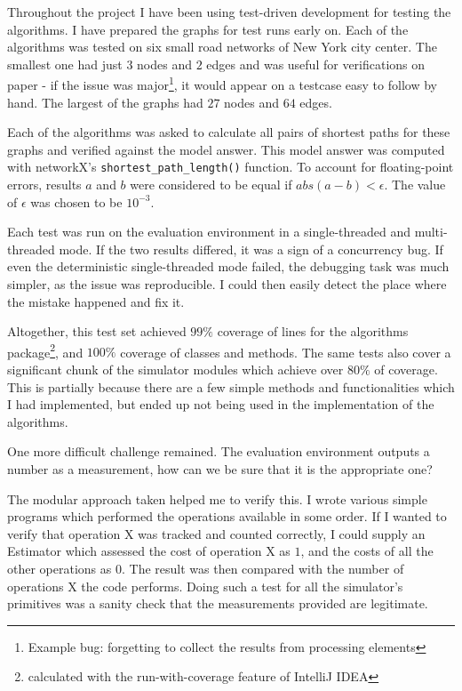 \documentclass[12pt,a4paper,twoside,openright]{report}
\begin{document}
Throughout the project I have been using test-driven development for testing the algorithms. I have prepared the graphs for test runs early on. Each of the algorithms was tested on six small road networks of New York city center. The smallest one had just $3$ nodes and $2$ edges and was useful for verifications on paper - if the issue was major\footnote{Example bug: forgetting to collect the results from processing elements}, it would appear on a testcase easy to follow by hand. The largest of the graphs had $27$ nodes and $64$ edges.

Each of the algorithms was asked to calculate all pairs of shortest paths for these graphs and verified against the model answer. This model answer was computed with networkX's \texttt{shortest\_path\_length()} function. To account for floating-point errors, results $a$ and $b$ were considered to be equal if $abs(a-b) < \epsilon$. The value of $\epsilon$ was chosen to be $10^{-3}$.

Each test was run on the evaluation environment in a single-threaded and multi-threaded mode. If the two results differed, it was a sign of a concurrency bug. If even the deterministic single-threaded mode failed, the debugging task was much simpler, as the issue was reproducible. I could then easily detect the place where the mistake happened and fix it.

Altogether, this test set achieved $99\%$ coverage of lines for the algorithms package\footnote{calculated with the run-with-coverage feature of IntelliJ IDEA}, and $100\%$ coverage of classes and methods. The same tests also cover a significant chunk of the simulator modules which achieve over $80\%$ of coverage. This is partially because there are a few simple methods and functionalities which I had implemented, but ended up not being used in the implementation of the algorithms.

One more difficult challenge remained. The evaluation environment outputs a number as a measurement, how can we be sure that it is the appropriate one? 

The modular approach taken helped me to verify this. I wrote various simple programs which performed the operations available in some order. If I wanted to verify that operation X was tracked and counted correctly, I could supply an Estimator which assessed the cost of operation X as $1$, and the costs of all the other operations as $0$. The result was then compared with the number of operations X the code performs. Doing such a test for all the simulator's primitives was a sanity check that the measurements provided are legitimate.
\end{document}

